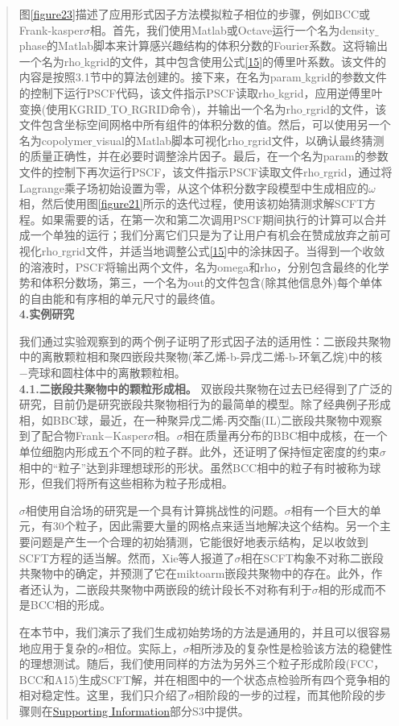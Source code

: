 \documentclass{article}
\begin{document}
\begin{CJK}{UTF8}{gkai}
\begin{quotation}
图\ref{figure23}描述了应用形式因子方法模拟粒子相位的步骤，例如BCC或Frank-kasper$\sigma$相。首先，我们使用Matlab或Octave运行一个名为density$\_$phase的Matlab脚本来计算感兴趣结构的体积分数的Fourier系数。这将输出一个名为rho$\_$kgrid的文件，其中包含使用公式\ref{15}的傅里叶系数。该文件的内容是按照3.1节中的算法创建的。接下来，在名为param$\_$kgrid的参数文件的控制下运行PSCF代码，该文件指示PSCF读取rho$\_$kgrid，应用逆傅里叶变换(使用KGRID$\_$TO$\_$RGRID命令)，并输出一个名为rho$\_$rgrid的文件，该文件包含坐标空间网格中所有组件的体积分数的值。然后，可以使用另一个名为copolymer$\_$visual的Matlab脚本可视化rho$\_$rgrid文件，以确认最终猜测的质量正确性，并在必要时调整涂片因子。最后，在一个名为param的参数文件的控制下再次运行PSCF，该文件指示PSCF读取文件rho$\_$rgrid，通过将Lagrange乘子场初始设置为零，从这个体积分数字段模型中生成相应的$\omega$相，然后使用图\ref{figure21}所示的迭代过程，使用该初始猜测求解SCFT方程。如果需要的话，在第一次和第二次调用PSCF期间执行的计算可以合并成一个单独的运行；我们分离它们只是为了让用户有机会在赞成放弃之前可视化rho$\_$rgrid文件，并适当地调整公式\ref{15}中的涂抹因子。当得到一个收敛的溶液时，PSCF将输出两个文件，名为omega和rho，分别包含最终的化学势和体积分数场，第三，一个名为out的文件包含(除其他信息外)每个单体的自由能和有序相的单元尺寸的最终值。\\
\textbf{4.实例研究}

我们通过实验观察到的两个例子证明了形式因子法的适用性：二嵌段共聚物中的离散颗粒相和聚四嵌段共聚物(苯乙烯-b-异戊二烯-b-环氧乙烷)中的核−壳球和圆柱体中的离散颗粒相。\\
\textbf{4.1.二嵌段共聚物中的颗粒形成相。}
双嵌段共聚物在过去已经得到了广泛的研究，目前仍是研究嵌段共聚物相行为的最简单的模型。除了经典例子形成相，如BBC球，最近，在一种聚异戊二烯-丙交酯(IL)二嵌段共聚物中观察到了配合物Frank−Kasper$\sigma$相。$\sigma$相在质量再分布的BBC相中成核，在一个单位细胞内形成五个不同的粒子群。此外，还证明了保持恒定密度的约束$\sigma$相中的“粒子”达到非理想球形的形状。虽然BCC相中的粒子有时被称为球形，但我们将所有这些相称为粒子形成相。

$\sigma$相使用自洽场的研究是一个具有计算挑战性的问题。$\sigma$相有一个巨大的单元，有30个粒子，因此需要大量的网格点来适当地解决这个结构。另一个主要问题是产生一个合理的初始猜测，它能很好地表示结构，足以收敛到SCFT方程的适当解。然而，Xie等人报道了$\sigma$相在SCFT构象不对称二嵌段共聚物中的确定，并预测了它在miktoarm嵌段共聚物中的存在。此外，作者还认为，二嵌段共聚物中两嵌段的统计段长不对称有利于$\sigma$相的形成而不是BCC相的形成。


在本节中，我们演示了我们生成初始势场的方法是通用的，并且可以很容易地应用于复杂的$\sigma$相位。实际上，$\sigma$相所涉及的复杂性是检验该方法的稳健性的理想测试。随后，我们使用同样的方法为另外三个粒子形成阶段(FCC，BCC和A15)生成SCFT解，并在相图中的一个状态点检验所有四个竞争相的相对稳定性。这里，我们只介绍了$\sigma$相阶段的一步的过程，而其他阶段的步骤则在\href{http://pubs.acs.org/doi/suppl/10.1021/acs.macromol.6b00107/suppl_file/ma6b00107_si_001.pdf}{Supporting Information}部分S3中提供。


\end{quotation}
\end{CJK}
\end{document}
